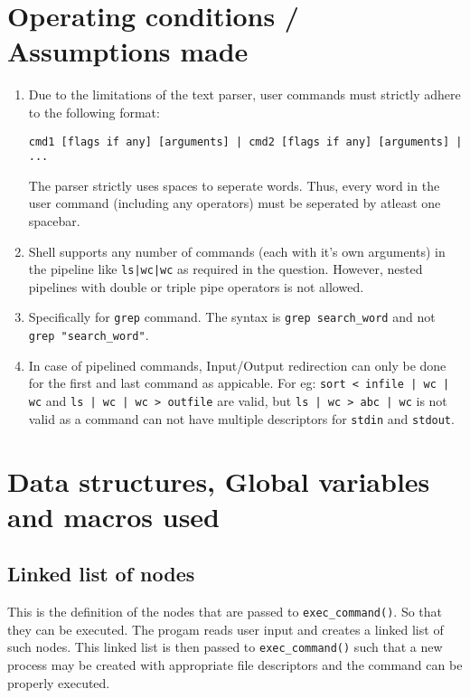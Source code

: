 \documentclass{article}
\begin{document}
\section{Operating conditions / Assumptions made}
\begin{enumerate}
\item
Due to the limitations of the text parser, user commands must strictly adhere to the following format:

\begin{lstlisting}
cmd1 [flags if any] [arguments] | cmd2 [flags if any] [arguments] | ...
\end{lstlisting}

The parser strictly uses spaces to seperate words. Thus, every word in the user command (including any operators) must be seperated by atleast one spacebar.

\item
Shell supports any number of commands (each with it's own arguments) in the pipeline like \lstinline{ls|wc|wc} as required in the question. However, nested pipelines with double or triple pipe operators is not allowed.

\item
Specifically for \lstinline{grep} command. The syntax is \lstinline{grep search_word} and not \lstinline{grep "search_word"}.

\item
In case of pipelined commands, Input/Output redirection can only be done for the first and last command as appicable. For eg: \lstinline{sort < infile | wc | wc} and \lstinline{ls | wc | wc > outfile} are valid, but \lstinline{ls | wc > abc | wc} is not valid as a command can not have multiple descriptors for \lstinline{stdin} and \lstinline{stdout}.
\end{enumerate}




\section{Data structures, Global variables and macros used}

\subsection{Linked list of nodes}

This is the definition of the nodes that are passed to \lstinline{exec_command()}. So that they can be executed. The progam reads user input and creates a linked list of such nodes. This linked list is then passed to \lstinline{exec_command()} such that a new process may be created with appropriate file descriptors and the command can be properly executed.
\end{document}
